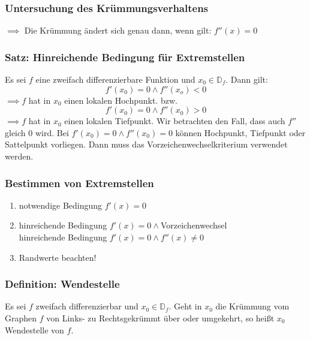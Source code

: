 \documentclass{article}
\begin{document}
  \subsubsection{Untersuchung des Krümmungsverhaltens}
  $\implies$ Die Krümmung ändert sich genau dann, wenn gilt: $f''(x) = 0$
  
  \subsubsection{Satz: Hinreichende Bedingung für Extremstellen}
  Es sei $f$ eine zweifach differenzierbare Funktion und $x_0 \in \mathbb{D}_f$. Dann gilt:
  \begin{equation*}
  	f'(x_0) = 0 \land f''(x_o) < 0
  \end{equation*}
  $\implies f$ hat in $x_0$ einen lokalen Hochpunkt.
  \newline
  \newline
  bzw.
  \begin{equation*}
  	f'(x_0) = 0 \land f''(x_0) > 0
  \end{equation*}
  $\implies f$ hat in $x_0$ einen lokalen Tiefpunkt.
  \newline
  \newline
  Wir betrachten den Fall, dass auch $f''$ gleich $0$ wird. Bei $f'(x_0) = 0 \land f''(x_0) = 0$ können Hochpunkt, Tiefpunkt oder Sattelpunkt vorliegen. Dann muss das Vorzeichenwechselkriterium verwendet werden.
  
  \subsubsection{Bestimmen von Extremstellen}
  \begin{enumerate}
  	\item notwendige Bedingung $f'(x) = 0$
  	\item hinreichende Bedingung $f'(x) = 0 \land$Vorzeichenwechsel \\
  	hinreichende Bedingung $f'(x) = 0 \land f''(x) \neq 0$
  	\item Randwerte beachten!
  \end{enumerate}
  
  \subsubsection{Definition: Wendestelle}
  Es sei $f$ zweifach differenzierbar und $x_0 \in \mathbb{D}_f$. Geht in $x_0$ die Krümmung vom Graphen $f$ von Links- zu Rechtsgekrümmt über oder umgekehrt, so heißt $x_0$ Wendestelle von $f$.
  
\end{document}
